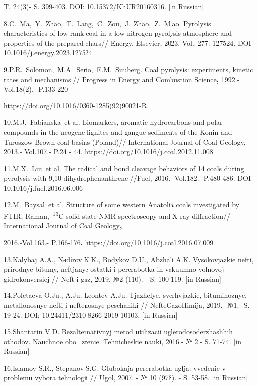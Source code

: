 T. 24(3)- S. 399-403. DOI: 10.15372/KhUR20160316. {[}in Russian{]}

8.C.~Ma,~Y.~Zhao,~T.~Lang,~C.~Zou,~J.~Zhao,~Z.~Miao. Pyrolysis
characteristics of low-rank coal in a low-nitrogen pyrolysis atmosphere
and properties of the prepared chars// Energy, Elsevier, 2023.-Vol.~277:
127524. DOI 10.1016/j.energy.2023.127524

9.P.R.~Solomon,~M.A.~Serio,~E.M.~Suuberg. Coal pyrolysis: experiments,
kinetic rates and mechanisms.// Progress in Energy and Combustion
Science{\bfseries ,} 1992.-Vol.18(2).- P.133-220

https://doi.org/10.1016/0360-1285(92)90021-R

10.M.J.~Fabianska\emph{~}et al\emph{.} Biomarkers, aromatic hydrocarbons
and polar compounds in the neogene lignites and gangue sediments of the
Konin and Turoszow Brown coal basins (Poland)// International Journal of
Coal Geology, 2013.- Vol.107.- P.24 - 44.
https://doi.org/10.1016/j.coal.2012.11.008

11.M.X.~Liu\emph{~}et al. The radical and bond cleavage behaviors of 14
coals during pyrolysis with 9,10-dihydrophenanthrene //Fuel, 2016.-
Vol.182.- P.480-486. DOI 10.1016/j.fuel.2016.06.006

12.M.~Baysal\emph{~}et al. Structure of some western Anatolia coals
investigated by FTIR, Raman,~\textsuperscript{13}C solid state NMR
spectroscopy and X-ray diffraction// International Journal of Coal
Geology{\bfseries ,}

2016.-Vol.163.- P.166-176{\bfseries .}
https://doi.org/10.1016/j.coal.2016.07.009

13.Kalybaj A.A., Nәdіrov N.K., Bodykov D.U., Abzhali A.K. Vysokovjazkie
nefti, prirodnye bitumy, neftjanye ostatki i pererabotka ih
vakuumno-volnovoj gidrokonversiej // Neft\textquotesingle{} i gaz,
2019.-№2 (110). - S. 100-119. {[}in Russian{]}

14.Poletaeva O.Ju., A.Ju. Leont\textquotesingle ev A.Ju. Tjazhelye,
sverhvjazkie, bituminoznye, metallonosnye nefti i neftenosnye peschaniki
// NefteGazoHimija, 2019.- №1.- S. 19-24. DOI:
10.24411/2310-8266-2019-10103. {[}in Russian{]}

15.Shantarin V.D. Bezal\textquotesingle ternativnyj metod utilizacii
uglerodosoderzhashhih othodov. Nauchnoe obo¬zrenie. Tehnicheskie nauki,
2016.- № 2.- S. 71-74. {[}in Russian{]}

16.Islamov S.R., Stepanov S.G. Glubokaja pererabotka uglja: vvedenie v
problemu vybora tehnologii // Ugol\textquotesingle, 2007. - № 10 (978).
- S. 53-58. {[}in Russian{]}

